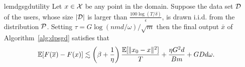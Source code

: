 







\begin{restatable}{lem}{dgsgdutility}
    \label{lm:dpsgd_utility}
    Let $x\in\mathcal{X}$ be any point in the domain.
    Suppose the data set $\mathcal{D}$ of the users, whose size $|\mathcal{D}|$ is larger than $\frac{100\log(T/\delta)}{\epsilon}$, is drawn i.i.d. from the distribution $\mathcal{P}$.
    Setting $\tau=G\log(nmd/\omega)/\sqrt{m}$
    then the final output $\bar{x}$ of Algorithm~\ref{alg:dpsgd} satisfies that
    \begin{align*}
        \operatorname*{\mathbb{E}}[F(\overline{x})-F(x)]\lesssim \left(\beta+\frac{1}{\eta} \right)\frac{\operatorname*{\mathbb{E}}[\|x_0-x\|^2]}{T}+\frac{\eta G^2d}{Bm}+GDd\omega.
    \end{align*}
\end{restatable}



